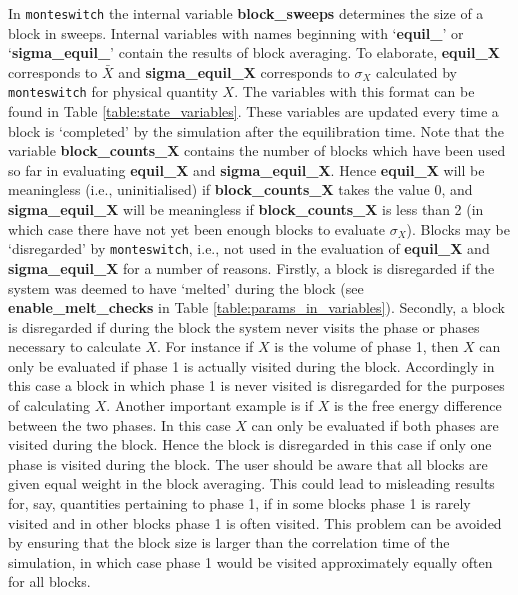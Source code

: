 \documentclass{report}
\begin{document}
In \texttt{monteswitch} the internal variable \textbf{block\_sweeps} determines the size of a block in sweeps. Internal variables with names 
beginning with `\textbf{equil\_}' or `\textbf{sigma\_equil\_}' contain the results of block averaging.
To elaborate, \textbf{equil\_X} corresponds to $\bar{X}$ and \textbf{sigma\_equil\_X} corresponds to $\sigma_X$ calculated by \texttt{monteswitch}
for physical quantity $X$. The variables with this format can be found in Table \ref{table:state_variables}. 
These variables are updated every time a block is `completed' by the simulation after the equilibration time. Note that
the variable \textbf{block\_counts\_X} contains the number of blocks which have been used so far in evaluating \textbf{equil\_X} and 
\textbf{sigma\_equil\_X}. Hence \textbf{equil\_X} will be meaningless (i.e., uninitialised) if \textbf{block\_counts\_X} takes the value 0, and 
\textbf{sigma\_equil\_X} will be meaningless if  \textbf{block\_counts\_X} is less than 2 (in which case there have not yet been enough blocks to 
evaluate $\sigma_X$). Blocks may be `disregarded' by \texttt{monteswitch}, i.e., not used in the evaluation of \textbf{equil\_X} and 
\textbf{sigma\_equil\_X} for a number of reasons. Firstly, a block is disregarded if the system was deemed to have `melted' during the block
(see \textbf{enable\_melt\_checks} in Table \ref{table:params_in_variables}). Secondly, a block is disregarded if during the block the system
never visits the phase or phases necessary to calculate $X$. For instance if $X$ is the volume of phase 1, then $X$ can only be evaluated if
phase 1 is actually visited during the block. Accordingly in this case a block in which phase 1 is never visited is disregarded for the 
purposes of calculating $X$. Another important example is if $X$ is the free energy difference between the two phases. In this case $X$
can only be evaluated if both phases are visited during the block. Hence the block is disregarded in this case if only one phase is visited
during the block. The user should be aware that all blocks are given equal weight in the block averaging. This could lead to misleading results
for, say, quantities pertaining to phase 1, if in some blocks phase 1 is rarely visited and in other blocks phase 1 is often visited. This problem
can be avoided by ensuring that the block size is larger than the correlation time of the simulation, in which case phase 1 would be visited
approximately equally often for all blocks.
\end{document}
